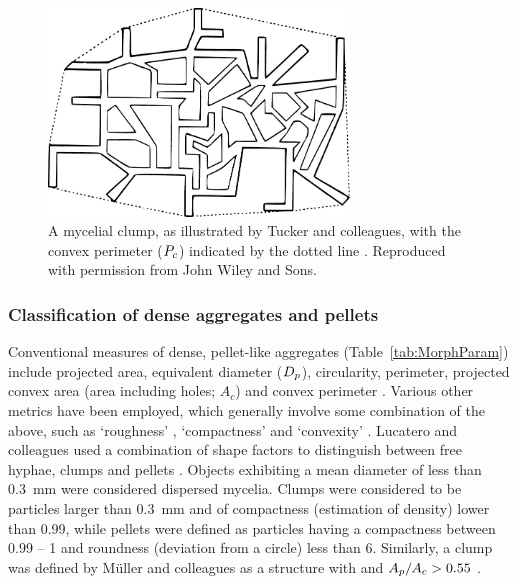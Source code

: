 \begin{figure}[tb]
	\centering
	\includegraphics[width=8cm]{../C2/Fig4Tucker1992}
  \caption{A mycelial clump, as illustrated by Tucker and colleagues, with the convex perimeter ($P_c$) indicated by the dotted line \cite{tucker1992}. Reproduced with permission from John Wiley and Sons.}
  \label{fig:Fig4Tucker1992}
\end{figure}

\subsubsection{Classification of dense aggregates and pellets}

Conventional measures of dense, pellet-like aggregates (Table~\ref{tab:MorphParam}) include projected area, equivalent diameter ($D_p$), circularity, perimeter, projected convex area (area including holes; $A_c$) and convex perimeter \cite{cox1998}. Various other metrics have been employed, which generally involve some combination of the above, such as \lq roughness' \cite{higashiyama1999}, \lq compactness' \cite{muller2002,jppark2002,muller2003} and \lq convexity'  \cite{papagianni2002,papagianni2004}. Lucatero and colleagues used a combination of shape factors to distinguish between free hyphae, clumps and pellets \cite{lucatero2004}. Objects exhibiting a mean diameter of less than 0.3~mm were considered dispersed mycelia. Clumps were considered to be particles larger than 0.3~mm and of compactness (estimation of density) lower than 0.99, while pellets were defined as particles having a compactness between 0.99 -- 1 and roundness (deviation from a circle) less than 6. Similarly, a clump was defined by M\"{u}ller and colleagues as a structure with  and $A_p/A_c > 0.55$ \cite{muller2002}.

